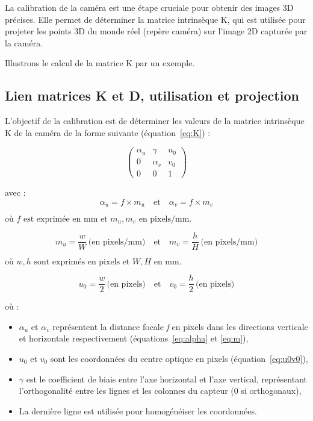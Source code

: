 \documentclass[12pt]{article}
\begin{document}
La calibration de la caméra est une étape cruciale pour obtenir des images 3D précises.
Elle permet de déterminer la matrice intrinsèque K, qui est utilisée pour projeter les points 3D du monde réel (repère caméra) sur l'image 2D capturée par la caméra.

Illustrons le calcul de la matrice K par un exemple.

\subsection{Lien matrices K et D, utilisation et projection}

L'objectif de la calibration est de déterminer les valeurs de la matrice intrinsèque K de la caméra de la forme suivante (équation~\ref{eq:K}) :

\begin{equation}
\begin{pmatrix}
\alpha_{u} & \gamma & u_0 \\
0 & \alpha_{v} & v_0 \\
0 & 0 & 1
\end{pmatrix}
\label{eq:K}
\end{equation}

avec :
\begin{equation}
\alpha_{u} = f \times m_{u} \quad \text{et} \quad \alpha_{v} = f \times m_{v}
\label{eq:alpha}
\end{equation}

$\text{où } f \text{ est exprimée en mm et } m_{u}, m_{v} \text{ en pixels/mm.}$

\begin{equation}
m_{u} = \frac{w}{W} \, \text{(en pixels/mm)} \quad \text{et} \quad m_{v} = \frac{h}{H} \, \text{(en pixels/mm)}
\label{eq:m}
\end{equation}

$\text{où } w, h \text{ sont exprimés en pixels et } W, H \text{ en mm.}$

\begin{equation}
u_{0} = \frac{w}{2} \, \text{(en pixels)} \quad \text{et} \quad v_{0} = \frac{h}{2}  \, \text{(en pixels)}
\label{eq:u0v0}
\end{equation}

où :
\begin{itemize}
    \item $\alpha_{u}$ et $\alpha_{v}$ représentent la distance focale \textit{f} en pixels dans les directions verticale et horizontale respectivement (équations~\ref{eq:alpha} et \ref{eq:m}),
    \item $u_0$ et $v_0$ sont les coordonnées du centre optique en pixels (équation~\ref{eq:u0v0}),
    \item $\gamma$ est le coefficient de biais entre l'axe horizontal et l'axe vertical, représentant l'orthogonalité entre les lignes et les colonnes du capteur (0 si orthogonaux),
    \item La dernière ligne est utilisée pour homogénéiser les coordonnées.
\end{itemize}
\vspace{1cm}
\end{document}
